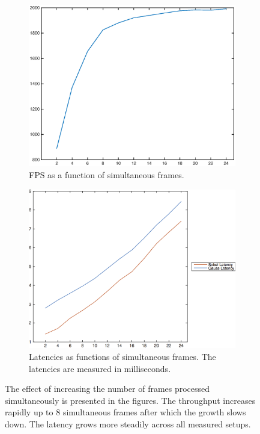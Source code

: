 \begin{figure}
    \centering
    \begin{subfigure}[t]{0.49\textwidth}
        \centering
        \includegraphics[width=0.99\linewidth]{images/simultaneous_frames_fps.eps}
        \caption{FPS as a function of simultaneous frames.}
        \label{fig:oeminitialframesfps}
    \end{subfigure}
    \begin{subfigure}[t]{0.49\textwidth}
        \centering
        \includegraphics[width=0.99\linewidth]{images/simultaneous_frames_latency-eps-converted-to-png.png}
        \caption{Latencies as functions of simultaneous frames. The latencies are measured in milliseconds.}
        \label{fig:oeminitialframeslat}
    \end{subfigure}
    \caption{The effect of increasing the number of frames processed simultaneously is presented in the figures. The throughput increases rapidly up to 8 simultaneous frames after which the growth slows down. The latency grows more steadily across all measured setups.}
\end{figure}

